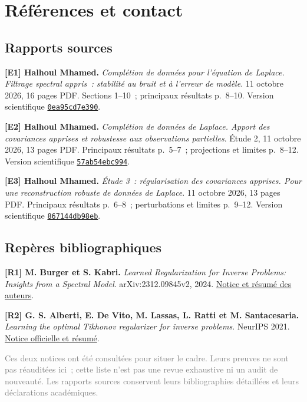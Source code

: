 \documentclass[11pt,a4paper]{article}
\newcommand{\src}[1]{\textcolor{graytext}{\footnotesize #1}}
\newcommand{\repo}{https://github.com/halhoulmhamed-droid/inverse-laplace-learning}
\newcommand{\shaone}{0ea95cd7e390c8a478469b36a043a5f99e4fcd10}
\newcommand{\shatwo}{57ab54ebc994029be3c24a8a34da56371547f4ac}
\newcommand{\shathree}{867144db98eba3c0f5fe7cece4261918a46f1c31}
\begin{document}
\newpage
\section*{Références et contact}
\subsection*{Rapports sources}
\hypertarget{refE1}{}\textbf{[E1] Halhoul Mhamed.}
\textit{Complétion de données pour l'équation de Laplace. Filtrage spectral appris~: stabilité
au bruit et à l'erreur de modèle}. 11 octobre 2026, 16 pages PDF.
Sections 1--10~; principaux résultats p.~8--10. Version scientifique
\href{\repo/tree/\shaone}{\texttt{0ea95cd7e390}}.

\hypertarget{refE2}{}\textbf{[E2] Halhoul Mhamed.}
\textit{Complétion de données de Laplace. Apport des covariances apprises et robustesse
aux observations partielles}. Étude 2, 11 octobre 2026, 13 pages PDF.
Principaux résultats p.~5--7~; projections et limites p.~8--12. Version scientifique
\href{\repo/tree/\shatwo}{\texttt{57ab54ebc994}}.

\hypertarget{refE3}{}\textbf{[E3] Halhoul Mhamed.}
\textit{Étude 3~: régularisation des covariances apprises. Pour une reconstruction robuste
de données de Laplace}. 11 octobre 2026, 13 pages PDF.
Principaux résultats p.~6--8~; perturbations et limites p.~9--12. Version scientifique
\href{\repo/tree/\shathree}{\texttt{867144db98eb}}.

\subsection*{Repères bibliographiques}
\hypertarget{refR1}{}\textbf{[R1] M. Burger et S. Kabri.}
\textit{Learned Regularization for Inverse Problems: Insights from a Spectral Model}.
arXiv:2312.09845v2, 2024.
\href{https://arxiv.org/abs/2312.09845}{Notice et résumé des auteurs}.

\hypertarget{refR2}{}\textbf{[R2] G. S. Alberti, E. De Vito, M. Lassas, L. Ratti et M. Santacesaria.}
\textit{Learning the optimal Tikhonov regularizer for inverse problems}. NeurIPS 2021.
\href{https://proceedings.neurips.cc/paper_files/paper/2021/hash/d3e6cd9f66f2c1d3840ade4161cf7406-Abstract.html}{Notice officielle et résumé}.

\src{Ces deux notices ont été consultées pour situer le cadre. Leurs preuves ne sont pas
réauditées ici~; cette liste n'est pas une revue exhaustive ni un audit de nouveauté.
Les rapports sources conservent leurs bibliographies détaillées et leurs déclarations académiques.}
\end{document}
